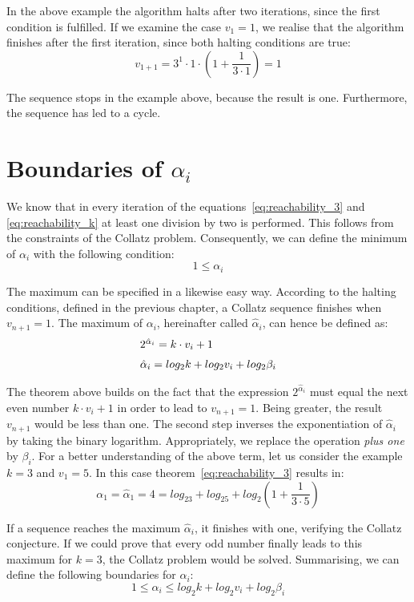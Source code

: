 \documentclass{SciPress_2015}
\begin{document}
In the above example the algorithm halts after two iterations, since the first condition is fulfilled. If we examine the case $v_1=1$, we realise that the algorithm finishes after the first iteration, since both halting conditions are true:
\[
v_{1+1}=3^1\cdot 1\cdot\left(1+\frac{1}{3\cdot1}\right)=1
\]

The sequence stops in the example above, because the result is one. Furthermore, the sequence has led to a cycle.

\section{Boundaries of \boldmath$\alpha_i$}
We know that in every iteration of the equations~\ref{eq:reachability_3} and \ref{eq:reachability_k} at least one division by two is performed. This follows from the constraints of the Collatz problem. Consequently, we can define the minimum of $\alpha_i$ with the following condition:
\[
1\le\alpha_i
\]

The maximum can be specified in a likewise easy way. According to the halting conditions, defined in the previous chapter, a Collatz sequence finishes when $v_{n+1}=1$. The maximum of $\alpha_i$, hereinafter called $\hat\alpha_i$, can hence be defined as:
\begin{equation}
\label{eq:alpha_max}
\begin{array}{l}
2^{\hat\alpha_i}=k\cdot v_i+1\\[\medskipamount]
\hat\alpha_i=log_2k+log_2v_i+log_2\beta_i
\end{array}	
\end{equation}

The theorem above builds on the fact that the expression $2^{\hat\alpha_i}$ must equal the next even number $k\cdot v_i+1$ in order to lead to $v_{n+1}=1$. Being greater, the result $v_{n+1}$ would be less than one. The second step inverses the exponentiation of $\hat\alpha_i$ by taking the binary logarithm. Appropriately, we replace the operation \textit{plus one} by $\beta_i$. For a better understanding of the above term, let us consider the example $k=3$ and $v_1=5$. In this case theorem~\ref{eq:reachability_3} results in:
\[
\alpha_1=\hat\alpha_1=4=log_23+log_25+log_2\left(1+\frac{1}{3\cdot5}\right)
\]

If a sequence reaches the maximum $\hat\alpha_i$, it finishes with one, verifying the Collatz conjecture. If we could prove that every odd number finally leads to this maximum for $k=3$, the Collatz problem would be solved. Summarising, we can define the following boundaries for $\alpha_i$:
\begin{equation}
\label{eq:boundary_alpha_i}
1\le\alpha_i\le log_2k+log_2v_i+log_2\beta_i
\end{equation}
\end{document}
